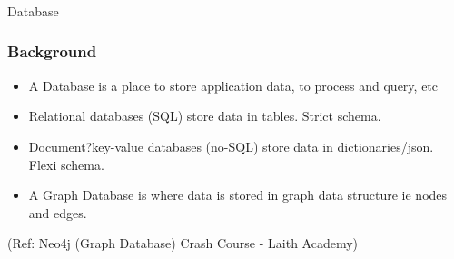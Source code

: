 \begin{frame}[fragile]\frametitle{}
\begin{center}
{\Large Database}
\end{center}
\end{frame}


\begin{frame}\frametitle{Background}

\begin{itemize}
\item A Database is a place to store application data, to process and query, etc

\item Relational databases (SQL) store data in tables. Strict schema.
\item Document?key-value databases (no-SQL) store data in dictionaries/json. Flexi schema.
\item A Graph Database is where data is stored in graph data structure ie nodes and edges.
\end{itemize}

{\tiny (Ref: Neo4j (Graph Database) Crash Course - Laith Academy)}
\end{frame}
